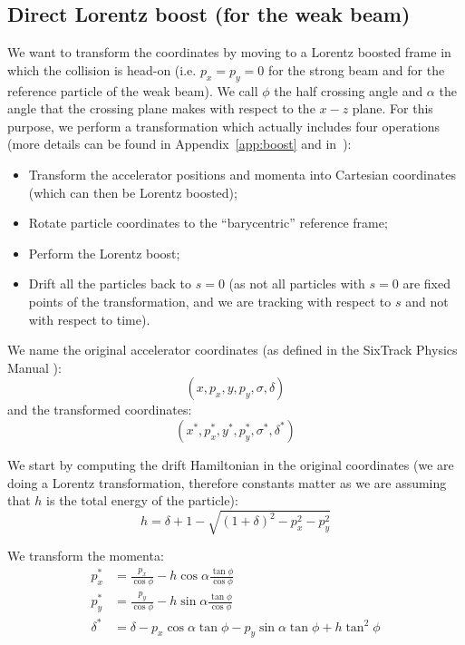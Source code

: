 \subsection{Direct Lorentz boost (for the weak beam)}
\label{sec:directboost}

We want to transform the coordinates by moving to a Lorentz boosted frame in which the collision is head-on (i.e. $p_x=p_y=0$ for the strong beam and for the reference particle of the weak beam). We call $\phi$ the half crossing angle and $\alpha$ the angle that the crossing plane makes with respect to the $x-z$ plane. For this purpose, we perform a transformation which actually includes four operations (more details can be found in Appendix~\ref{app:boost} and in~\cite{bb6dslides, beam_beam}):
\begin{itemize}
\item Transform the accelerator positions and momenta into Cartesian coordinates (which can then be Lorentz boosted);
\item Rotate particle coordinates to the ``barycentric'' reference frame;
\item Perform the Lorentz boost;
\item Drift all the particles back to $s=0$ (as not all particles with $s=0$ are fixed points of the transformation, and we are tracking with respect to $s$ and not with respect to time).
\end{itemize}

We name the original accelerator coordinates (as defined in the SixTrack Physics Manual \cite{sixtracksite}):
\begin{equation}
\left(x, p_x, y, p_y, \sigma, \delta\right)
\end{equation}
and the transformed coordinates:
\begin{equation}
\left(x^*, p_x^*, y^*, p_y^*, \sigma^*, \delta^*\right)
\end{equation}



We start by computing the drift Hamiltonian in the original coordinates (we are doing a Lorentz transformation, therefore constants matter as we are assuming that $h$ is the total energy of the particle):
\begin{equation}
h = \delta + 1 -\sqrt{\left(1+\delta\right)^2-p_x^2-p_y^2}
\end{equation}

We transform the momenta:
\begin{align}
p_x^* &= \frac{p_x}{\cos \phi} - h \cos \alpha \frac{\tan \phi}{\cos \phi} \label{eq:px}\\ 
p_y^* & = \frac{p_y}{\cos \phi} - h \sin \alpha \frac{\tan \phi}{\cos \phi}\\ 
\delta^* & = \delta -p_x \cos \alpha \tan \phi - p_y \sin \alpha \tan \phi +h \tan^2 \phi \label{eq:delta}
\end{align}

